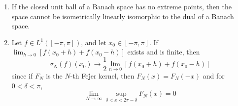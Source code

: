 \documentclass{article}
\theoremstyle{definition}
\begin{document}
\begin{enumerate}
	\item If the closed unit ball of a Banach space has no extreme points, then the space cannot be isometrically linearly isomorphic to the dual of a Banach space.

	\item Let $f \in L^1([-\pi, \pi])$, and let $x_0 \in [-\pi, \pi]$.
		If $\lim_{h \to 0} [f(x_0 + h) + f(x_0 - h)]$ exists and is finite, then
		\[
			\sigma_N(f)(x_0) \to \frac{1}{2} \lim_{n \to 0} [f(x_0 + h) + f(x_0 - h)]
		\]
		since if $F_N$ is the $N$-th Fe\'jer kernel, then $F_N(x) = F_N(-x)$ and for $0 < \delta < \pi$, 
		\[
			\lim_{N \to \infty} \sup_{\delta < x < 2\pi - \delta} F_N(x) = 0
		\]
\end{enumerate}
\end{document}
